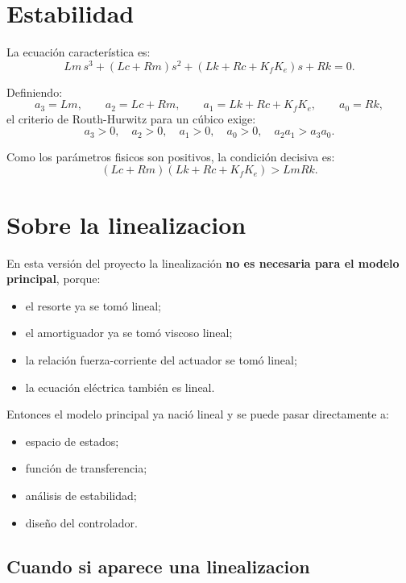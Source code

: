 \documentclass[11pt]{article}
\begin{document}
\section{Estabilidad}

La ecuaci\'on caracter\'istica es:
\[
Lm\,s^3 + (Lc+Rm)s^2 + (Lk+Rc+K_fK_e)s + Rk = 0.
\]

Definiendo:
\[
a_3=Lm,\qquad
a_2=Lc+Rm,\qquad
a_1=Lk+Rc+K_fK_e,\qquad
a_0=Rk,
\]
el criterio de Routh-Hurwitz para un c\'ubico exige:
\begin{equation}
a_3>0,\quad a_2>0,\quad a_1>0,\quad a_0>0,\quad a_2a_1>a_3a_0.
\label{eq:RH}
\end{equation}

Como los par\'ametros fisicos son positivos, la condici\'on decisiva es:
\begin{equation}
(Lc+Rm)(Lk+Rc+K_fK_e) > LmRk.
\label{eq:RHcond}
\end{equation}

\section{Sobre la linealizacion}

En esta versi\'on del proyecto la linealizaci\'on \textbf{no es necesaria para el modelo principal}, porque:

\begin{itemize}[leftmargin=1.2cm]
\item el resorte ya se tom\'o lineal;
\item el amortiguador ya se tom\'o viscoso lineal;
\item la relaci\'on fuerza-corriente del actuador se tom\'o lineal;
\item la ecuaci\'on el\'ectrica tambi\'en es lineal.
\end{itemize}

Entonces el modelo principal ya naci\'o lineal y se puede pasar directamente a:

\begin{itemize}[leftmargin=1.2cm]
\item espacio de estados;
\item funci\'on de transferencia;
\item an\'alisis de estabilidad;
\item dise\~no del controlador.
\end{itemize}

\subsection{Cuando si aparece una linealizacion}
\end{document}
